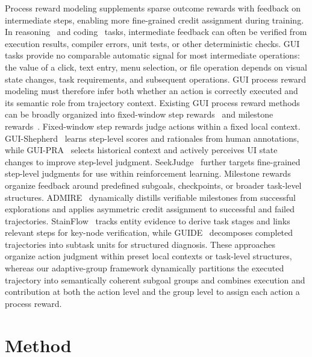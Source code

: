 Process reward modeling supplements sparse outcome rewards with feedback on intermediate steps, enabling more fine-grained credit assignment during training. In reasoning~\cite{lightman2023verify,wang2023mathshepherd} and coding~\cite{le2022coderl,liu2023rltf,dai2026gvpo} tasks, intermediate feedback can often be verified from execution results, compiler errors, unit tests, or other deterministic checks. GUI tasks provide no comparable automatic signal for most intermediate operations: the value of a click, text entry, menu selection, or file operation depends on visual state changes, task requirements, and subsequent operations. GUI process reward modeling must therefore infer both whether an action is correctly executed and its semantic role from trajectory context.
Existing GUI process reward methods can be broadly organized into fixed-window step rewards~\cite{chen2025guishepherd,xiong2025guipra,xiao2025uigenie,lu2025orcust,wan2026seekjudge} and milestone rewards~\cite{zheng2026admire,hao2026stainflow,li2026magicgui,dai2026prore,zhai2026guide}. Fixed-window step rewards judge actions within a fixed local context. GUI-Shepherd~\cite{chen2025guishepherd} learns step-level scores and rationales from human annotations, while GUI-PRA~\cite{xiong2025guipra} selects historical context and actively perceives UI state changes to improve step-level judgment. SeekJudge~\cite{wan2026seekjudge} further targets fine-grained step-level judgments for use within reinforcement learning. Milestone rewards organize feedback around predefined subgoals, checkpoints, or broader task-level structures. ADMIRE~\cite{zheng2026admire} dynamically distills verifiable milestones from successful explorations and applies asymmetric credit assignment to successful and failed trajectories. StainFlow~\cite{hao2026stainflow} tracks entity evidence to derive task stages and links relevant steps for key-node verification, while GUIDE~\cite{zhai2026guide} decomposes completed trajectories into subtask units for structured diagnosis. These approaches organize action judgment within preset local contexts or task-level structures, whereas our adaptive-group framework dynamically partitions the executed trajectory into semantically coherent subgoal groups and combines execution and contribution at both the action level and the group level to assign each action a process reward.

\section{Method}
\label{sec:method}


